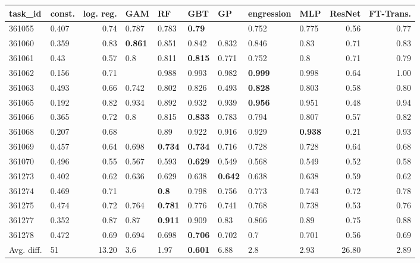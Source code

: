 \begin{table}[ht!]
\centering
\begingroup\footnotesize
\begin{tabular}{llrllllllrr}
  \hline
\hline
task\_id & const. & log. reg. & GAM & RF & GBT & GP & engression & MLP & ResNet & FT-Trans. \\ 
  \hline
361055 & 0.407 & 0.74 & 0.787 & 0.783 & \textbf{0.79} &  & 0.752 & 0.775 & 0.56 & 0.77 \\ 
  361060 & 0.359 & 0.83 & \textbf{0.861} & 0.851 & 0.842 & 0.832 & 0.846 & 0.83 & 0.71 & 0.83 \\ 
  361061 & 0.43 & 0.57 & 0.8 & 0.811 & \textbf{0.815} & 0.771 & 0.752 & 0.8 & 0.71 & 0.79 \\ 
  361062 & 0.156 & 0.71 &  & 0.988 & 0.993 & 0.982 & \textbf{0.999} & 0.998 & 0.64 & 1.00 \\ 
  361063 & 0.493 & 0.66 & 0.742 & 0.802 & 0.826 & 0.493 & \textbf{0.828} & 0.803 & 0.58 & 0.80 \\ 
  361065 & 0.192 & 0.82 & 0.934 & 0.892 & 0.932 & 0.939 & \textbf{0.956} & 0.951 & 0.48 & 0.94 \\ 
  361066 & 0.365 & 0.72 & 0.8 & 0.815 & \textbf{0.833} & 0.783 & 0.794 & 0.807 & 0.57 & 0.82 \\ 
  361068 & 0.207 & 0.68 &  & 0.89 & 0.922 & 0.916 & 0.929 & \textbf{0.938} & 0.21 & 0.93 \\ 
  361069 & 0.457 & 0.64 & 0.698 & \textbf{0.734} & \textbf{0.734} & 0.716 & 0.728 & 0.728 & 0.64 & 0.68 \\ 
  361070 & 0.496 & 0.55 & 0.567 & 0.593 & \textbf{0.629} & 0.549 & 0.568 & 0.549 & 0.52 & 0.58 \\ 
  361273 & 0.402 & 0.62 & 0.636 & 0.629 & 0.638 & \textbf{0.642} & 0.638 & 0.638 & 0.59 & 0.62 \\ 
  361274 & 0.469 & 0.71 &  & \textbf{0.8} & 0.798 & 0.756 & 0.773 & 0.743 & 0.72 & 0.78 \\ 
  361275 & 0.474 & 0.72 & 0.764 & \textbf{0.781} & 0.776 & 0.741 & 0.768 & 0.738 & 0.53 & 0.76 \\ 
  361277 & 0.352 & 0.87 & 0.87 & \textbf{0.911} & 0.909 & 0.83 & 0.866 & 0.89 & 0.75 & 0.88 \\ 
  361278 & 0.472 & 0.69 & 0.694 & 0.698 & \textbf{0.706} & 0.702 & 0.7 & 0.701 & 0.56 & 0.69 \\ 
   \hline
Avg. diff. & 51 & 13.20 & 3.6 & 1.97 & \textbf{0.601} & 6.88 & 2.8 & 2.93 & 26.80 & 2.89 \\ 

\end{tabular}
\end{table}
